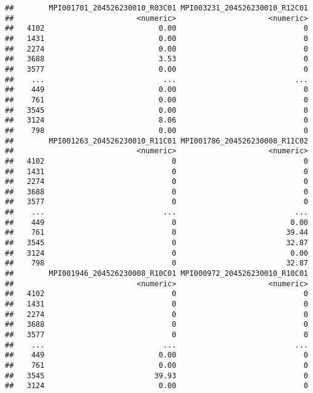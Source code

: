 \documentclass[
]{article}
\begin{document}
\begin{verbatim}
##        MPI001701_204526230010_R03C01 MPI003231_204526230010_R12C01
##                            <numeric>                     <numeric>
##   4102                          0.00                             0
##   1431                          0.00                             0
##   2274                          0.00                             0
##   3688                          3.53                             0
##   3577                          0.00                             0
##    ...                           ...                           ...
##    449                          0.00                             0
##    761                          0.00                             0
##   3545                          0.00                             0
##   3124                          8.06                             0
##    798                          0.00                             0
##        MPI001263_204526230010_R11C01 MPI001786_204526230008_R11C02
##                            <numeric>                     <numeric>
##   4102                             0                             0
##   1431                             0                             0
##   2274                             0                             0
##   3688                             0                             0
##   3577                             0                             0
##    ...                           ...                           ...
##    449                             0                          0.00
##    761                             0                         39.44
##   3545                             0                         32.87
##   3124                             0                          0.00
##    798                             0                         32.87
##        MPI001946_204526230008_R10C01 MPI000972_204526230010_R10C01
##                            <numeric>                     <numeric>
##   4102                             0                             0
##   1431                             0                             0
##   2274                             0                             0
##   3688                             0                             0
##   3577                             0                             0
##    ...                           ...                           ...
##    449                          0.00                             0
##    761                          0.00                             0
##   3545                         39.93                             0
##   3124                          0.00                             0

\end{verbatim}
\end{document}
